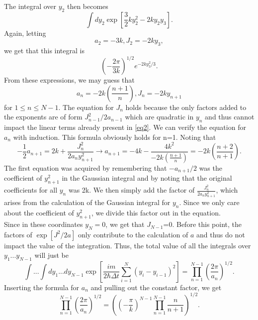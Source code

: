The integral over $y_2$ then becomes
\begin{equation}
    \int dy_2\exp[\frac 3 2 ky_2^2-2ky_2y_3].
\end{equation}
Again, letting 
\begin{equation}
    a_2=-3k, J_2=-2ky_3,
\end{equation}
we get that this integral is 
\begin{equation}
    \left(-\frac{2\pi}{3k}\right)^{1/2}e^{-2ky_3^2/3}.
\end{equation}
From these expressions, we may guess that
\begin{equation}
    a_n=-2k\left(\frac{n+1}{n}\right), J_n=-2ky_{n+1}
\end{equation}
for $1\le n\le N-1$. The equation for $J_n$ holds because the only factors added to the exponents are of form $J_{n-1}^2/2a_{n-1}$ which are quadratic in $y_n$ and thus cannot impact the linear terms already present in \eqref{eq2}. We can verify the equation for $a_n$ with induction. This formula obviously holds for n=1. Noting that 
\begin{equation}
    -\frac 1 2 a_{n+1}=2k+\frac{J_{n}^2}{2a_{n}y_{n+1}^2}\to a_{n+1}=-4k-\frac{4k^2}{-2k\left(\frac{n+1}{n}\right)}=-2k\left(\frac{n+2}{n+1}\right).
\end{equation}
The first equation was acquired by remembering that $-a_{n+1}/2$ was the coefficient of $y_{n+1}^2$ in the Gaussian integral and by noting that the original coefficients for all $y_n$ was 2k. We then simply add the factor of $\frac{J_{n}^2}{2a_{n}y_{n+1}^2}$, which arises from the calculation of the Gaussian integral for $y_{n}$. Since we only care about the coefficient of $y_{n+1}^2$, we divide this factor out in the equation. \\
Since in these coordinates $y_N=0$, we get that $J_{N-1}$=0. Before this point, the factors of $\exp[J^2/2a]$ only contribute to the calculation of $a$ and thus do not impact the value of the integration. Thus, the total value of all the integrals over $y_1...y_{N-1}$ will just be
\begin{equation}
    \int...\int dy_1...dy_{N-1}\exp[\frac{im}{2\hbar\Delta t}\sum_{i=1}^N(y_i-y_{i-1})^2]=\prod_{n=1}^{N-1}\left ( \frac{2\pi}{a_n}\right )^{1/2}.
\end{equation}
Inserting the formula for $a_n$ and pulling out the constant factor, we get 
\begin{equation}
    \prod_{n=1}^{N-1}\left ( \frac{2\pi}{a_n}\right )^{1/2}=\left(\left(-\frac\pi k\right)^{N-1}\prod_{n=1}^{N-1}\frac n {n+1}\right )^{1/2}.
\end{equation}
